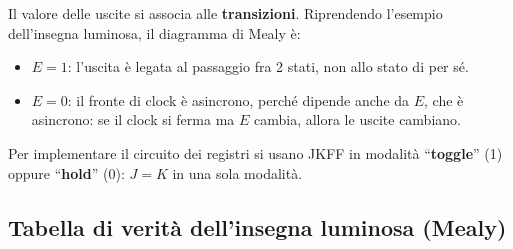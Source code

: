 \documentclass[11pt,a4paper]{report}
\begin{document}
\noindent Il valore delle uscite si associa alle \textbf{transizioni}. Riprendendo l'esempio
dell'insegna luminosa, il diagramma di Mealy è:

\begin{center}
\end{center}

\begin{itemize}[leftmargin=1.5em]
    \item $E=1$: l'uscita è legata al passaggio fra 2 stati, non allo stato di per sé.
    \item $E=0$: il fronte di clock è asincrono, perché dipende anche da $E$, che è
          asincrono: se il clock si ferma ma $E$ cambia, allora le uscite cambiano.
\end{itemize}

\noindent Per implementare il circuito dei registri si usano JKFF in modalità
``\textbf{toggle}'' (1) oppure ``\textbf{hold}'' (0): $J=K$ in una sola modalità.

\subsection{Tabella di verità dell'insegna luminosa (Mealy)}
\end{document}
